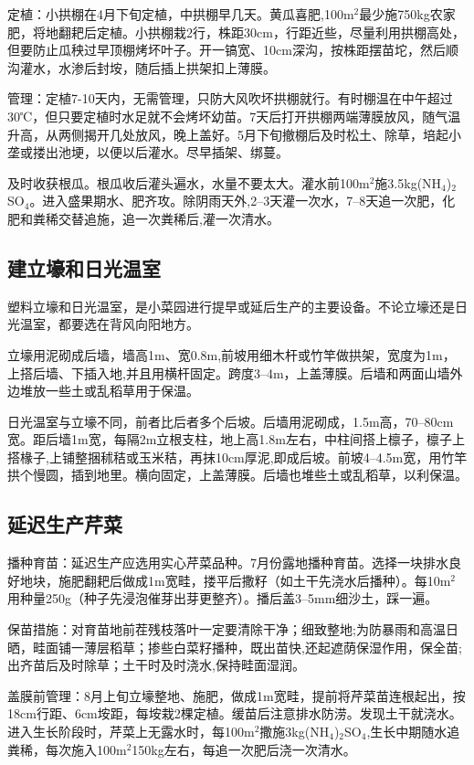 \documentclass{ctexbook}
\begin{document}
定植：小拱棚在4月下旬定植，中拱棚早几天。黄瓜喜肥,100m$^2$最少施750kg农家肥，将地翻耙后定植。小拱棚栽2行，株距30cm，行距近些，尽量利用拱棚高处，但要防止瓜秧过早顶棚烤坏叶子。开一镐宽、10cm深沟，按株距摆苗坨，然后顺沟灌水，水渗后封垵，​随后插上拱架扣上薄膜。

管理：定植7-10天内，无需管理，只防大风吹坏拱棚就行。有时棚温在中午超过30℃，但只要定植时水足就不会烤坏幼苗。7天后打开拱棚两端薄膜放风，随气温升高，从两侧揭开几处放风，晚上盖好。5月下旬撤棚后及时松土、除草，培起小垄或搂出池埂，以便以后灌水。尽早插架、绑蔓。

及时收获根瓜。根瓜收后灌头遍水，水量不要太大。灌水前100m$^2$施3.5kg(NH$_4$)$_2$SO$_4$。进入盛果期水、肥齐攻。除阴雨天外,2--3天灌一次水，7--8天追一次肥，化肥和粪稀交替追施，追一次粪稀后,灌一次清水。

\subsection{建立壕和日光温室}
塑料立壕和日光温室，是小菜园进行提早或延后生产的主要设备。不论立壕还是日光温室，都要选在背风向阳地方。

立壕用泥砌成后墙，墙高1m、宽0.8m,前坡用细木杆或竹竿做拱架，宽度为1m，上搭后墙、下插入地,并且用横杆固定。跨度3--4m，上盖薄膜。后墙和两面山墙外边堆放一些土或乱稻草用于保温。

日光温室与立壕不同，前者比后者多个后坡。后墙用泥砌成，1.5m高，70--80cm宽。距后墙1m宽，每隔2m立根支柱，地上高1.8m左右，中柱间搭上檩子，檩子上搭椽子,上铺整捆秫秸或玉米秸，再抹10cm厚泥,即成后坡。前坡4--4.5m宽，用竹竿拱个慢圆，插到地里。横向固定，上盖薄膜。后墙也堆些土或乱稻草，以利保温。

\subsection{延迟生产芹菜}
播种育苗：延迟生产应选用实心芹菜品种。7月份露地播种育苗。选择一块排水良好地块，施肥翻耙后做成1m宽畦，搂平后撒籽（如土干先浇水后播种）。每10m$^2$用种量250g（种子先浸泡催芽出芽更整齐）。播后盖3--5mm细沙土，踩一遍。

保苗措施：对育苗地前茬残枝落叶一定要清除干净；细致整地;为防暴雨和高温日晒，畦面铺一薄层稻草；掺些白菜籽播种，既出苗快,还起遮荫保湿作用，保全苗;出齐苗后及时除草；土干时及时浇水,保持畦面湿润。

盖膜前管理：8月上旬立壕整地、施肥，做成1m宽畦，提前将芹菜苗连根起出，按18cm行距、6cm垵距，每垵栽2棵定植。缓苗后注意排水防涝。发现土干就浇水。进入生长阶段时，芹菜上无露水时，每100m$^2$撒施3kg(NH$_4$)$_2$SO$_4$,生长中期随水追粪稀，每次施入100m$^2$150kg左右，每追一次肥后浇一次清水。
\end{document}
